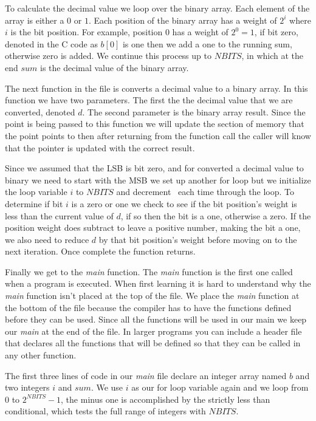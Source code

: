 To calculate the decimal value we loop over the binary array. Each element of the array is either a $0$ or $1$. Each position of the binary array has a weight of $2^i$ where $i$ is the bit position. For example, position $0$ has a weight of $2^0 = 1$, if bit zero, denoted in the C code as $b[0]$ is one then we add a one to the running sum, otherwise zero is added. We continue this process up to $NBITS$, in which at the end $sum$ is the decimal value of the binary array.

The next function in the file is converts a decimal value to a binary array. In this function we have two parameters. The first the the decimal value that we are converted, denoted $d$. The second parameter is the binary array result. Since the point is being passed to this function we will update the section of memory that the point points to then after returning from the function call the caller will know that the pointer is updated with the correct result. 

Since we assumed that the \ac{LSB} is bit zero, and for converted a decimal value to binary we need to start with the \ac{MSB} we set up another for loop but we initialize the loop variable $i$ to $NBITS$ and decrement  each time through the loop. To determine if bit $i$ is a zero or one we check to see if the bit position's weight is less than the current value of $d$, if so then the bit is a one, otherwise a zero. If the position weight does subtract to leave a positive number, making the bit a one, we also need to reduce $d$ by that bit position's weight before moving on to the next iteration. Once complete the function returns. 

Finally we get to the \emph{main} function. The \emph{main} function is the first one called when a program is executed. When first learning it is hard to understand why the \emph{main} function isn't placed at the top of the file. We place the \emph{main} function at the bottom of the file because the compiler has to have the functions defined before they can be used. Since all the functions will be used in our main we keep our \emph{main} at the end of the file. In larger programs you can include a header file that declares all the functions that will be defined so that they can be called in any other function. 

The first three lines of code in our \emph{main} file declare an integer array named $b$ and two integers $i$ and $sum$. We use $i$ as our for loop variable again and we loop from $0$ to $2^{NBITS}-1$, the minus one is accomplished by the strictly less than conditional, which tests the full range of integers with $NBITS$. 

